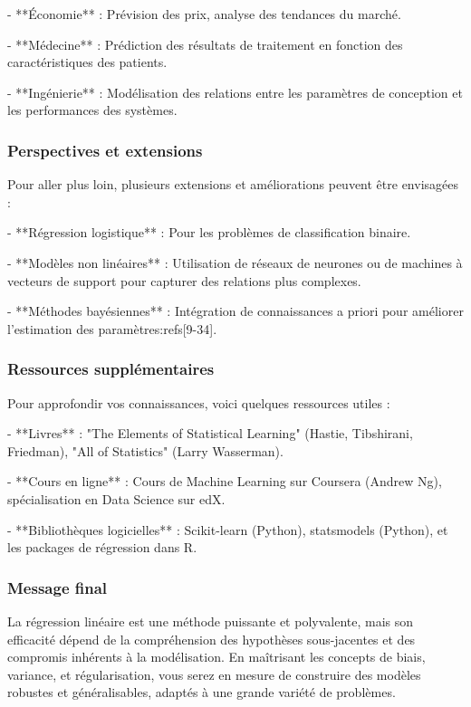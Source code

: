 \documentclass[10pt,a4paper]{article}
\begin{document}
- **Économie** : Prévision des prix, analyse des tendances du marché.

- **Médecine** : Prédiction des résultats de traitement en fonction des caractéristiques des patients.

- **Ingénierie** : Modélisation des relations entre les paramètres de conception et les performances des systèmes.

\subsubsection*{Perspectives et extensions}

Pour aller plus loin, plusieurs extensions et améliorations peuvent être envisagées :

- **Régression logistique** : Pour les problèmes de classification binaire.

- **Modèles non linéaires** : Utilisation de réseaux de neurones ou de machines à vecteurs de support pour capturer des relations plus complexes.

- **Méthodes bayésiennes** : Intégration de connaissances a priori pour améliorer l'estimation des paramètres:refs[9-34].

\subsubsection*{Ressources supplémentaires}

Pour approfondir vos connaissances, voici quelques ressources utiles :

- **Livres** : "The Elements of Statistical Learning" (Hastie, Tibshirani, Friedman), "All of Statistics" (Larry Wasserman).

- **Cours en ligne** : Cours de Machine Learning sur Coursera (Andrew Ng), spécialisation en Data Science sur edX.

- **Bibliothèques logicielles** : Scikit-learn (Python), statsmodels (Python), et les packages de régression dans R.

\subsubsection*{Message final}

La régression linéaire est une méthode puissante et polyvalente, mais son efficacité dépend de la compréhension des hypothèses sous-jacentes et des compromis inhérents à la modélisation. En maîtrisant les concepts de biais, variance, et régularisation, vous serez en mesure de construire des modèles robustes et généralisables, adaptés à une grande variété de problèmes.
\end{document}
